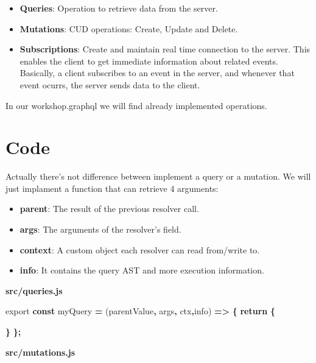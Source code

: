 \documentclass[]{book}
\newenvironment{Shaded}{\begin{snugshade}}{\end{snugshade}}
\newcommand{\KeywordTok}[1]{\textcolor[rgb]{0.13,0.29,0.53}{\textbf{#1}}}
\newcommand{\ImportTok}[1]{#1}
\newcommand{\ControlFlowTok}[1]{\textcolor[rgb]{0.13,0.29,0.53}{\textbf{#1}}}
\newcommand{\OperatorTok}[1]{\textcolor[rgb]{0.81,0.36,0.00}{\textbf{#1}}}
\newcommand{\NormalTok}[1]{#1}
\providecommand{\tightlist}{%
  \setlength{\itemsep}{0pt}\setlength{\parskip}{0pt}}
\begin{document}
\begin{itemize}
\tightlist
\item
  \textbf{Queries}: Operation to retrieve data from the server.
\item
  \textbf{Mutations}: CUD operations: Create, Update and Delete.
\item
  \textbf{Subscriptions}: Create and maintain real time connection to
  the server. This enables the client to get immediate information about
  related events. Basically, a client subscribes to an event in the
  server, and whenever that event ocurrs, the server sends data to the
  client.
\end{itemize}

In our workshop.graphql we will find already implemented operations.

\section{Code}\label{code-1}

Actually there's not difference between implement a query or a mutation.
We will just implament a function that can retrieve 4 arguments:

\begin{itemize}
\tightlist
\item
  \textbf{parent}: The result of the previous resolver call.
\item
  \textbf{args}: The arguments of the resolver's field.
\item
  \textbf{context}: A custom object each resolver can read from/write
  to.
\item
  \textbf{info}: It contains the query AST and more execution
  information.
\end{itemize}

\textbf{src/queries.js}

\begin{Shaded}
\begin{Highlighting}[]

\ImportTok{export} \KeywordTok{const}\NormalTok{ myQuery }\OperatorTok{=}\NormalTok{ (parentValue}\OperatorTok{,}\NormalTok{ args}\OperatorTok{,}\NormalTok{ ctx}\OperatorTok{,}\NormalTok{info) }\OperatorTok{=>} \OperatorTok{\{}
    \ControlFlowTok{return} \OperatorTok{\{}
        
    \OperatorTok{\}}
\OperatorTok{\};}
\end{Highlighting}
\end{Shaded}

\textbf{src/mutations.js}
\end{document}
